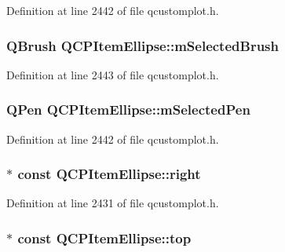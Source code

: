 Definition at line 2442 of file qcustomplot.\-h.

\hypertarget{class_q_c_p_item_ellipse_a2e49d5547478aa36910ed8a2dcc8a5c0}{
\subsubsection[{m\-Selected\-Brush}]{\setlength{\rightskip}{0pt plus 5cm}Q\-Brush Q\-C\-P\-Item\-Ellipse\-::m\-Selected\-Brush\hspace{0.3cm}{\ttfamily [protected]}}}\label{class_q_c_p_item_ellipse_a2e49d5547478aa36910ed8a2dcc8a5c0}


Definition at line 2443 of file qcustomplot.\-h.

\hypertarget{class_q_c_p_item_ellipse_a57b047abfce6f1a84ed46ca668c90e21}{
\subsubsection[{m\-Selected\-Pen}]{\setlength{\rightskip}{0pt plus 5cm}Q\-Pen Q\-C\-P\-Item\-Ellipse\-::m\-Selected\-Pen\hspace{0.3cm}{\ttfamily [protected]}}}\label{class_q_c_p_item_ellipse_a57b047abfce6f1a84ed46ca668c90e21}


Definition at line 2442 of file qcustomplot.\-h.

\hypertarget{class_q_c_p_item_ellipse_a50091a3bd8761d3ce0d95d9c727e4a82}{
\subsubsection[{right}]{$\ast$ const Q\-C\-P\-Item\-Ellipse\-::right}}\label{class_q_c_p_item_ellipse_a50091a3bd8761d3ce0d95d9c727e4a82}


Definition at line 2431 of file qcustomplot.\-h.

\hypertarget{class_q_c_p_item_ellipse_ad50f907d6f9d1402c6c5d302dca5c5d5}{
\subsubsection[{top}]{$\ast$ const Q\-C\-P\-Item\-Ellipse\-::top}}\label{class_q_c_p_item_ellipse_ad50f907d6f9d1402c6c5d302dca5c5d5}


